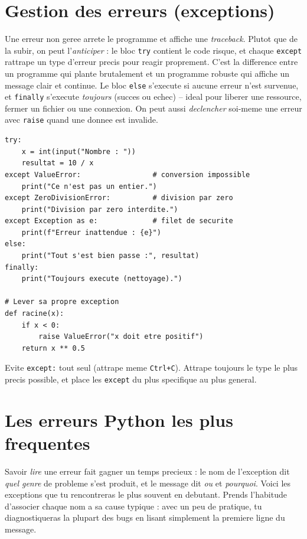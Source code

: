 \documentclass[11pt,a4paper]{article}
\begin{document}
\section{Gestion des erreurs (exceptions)}
Une erreur non geree arrete le programme et affiche une \emph{traceback}. Plutot
que de la subir, on peut l'\emph{anticiper} : le bloc \texttt{try} contient le
code risque, et chaque \texttt{except} rattrape un type d'erreur precis pour
reagir proprement. C'est la difference entre un programme qui plante brutalement
et un programme robuste qui affiche un message clair et continue. Le bloc
\texttt{else} s'execute si aucune erreur n'est survenue, et \texttt{finally}
s'execute \emph{toujours} (succes ou echec) -- ideal pour liberer une ressource,
fermer un fichier ou une connexion. On peut aussi \emph{declencher} soi-meme une
erreur avec \texttt{raise} quand une donnee est invalide.

\begin{lstlisting}
try:
    x = int(input("Nombre : "))
    resultat = 10 / x
except ValueError:                 # conversion impossible
    print("Ce n'est pas un entier.")
except ZeroDivisionError:          # division par zero
    print("Division par zero interdite.")
except Exception as e:             # filet de securite
    print(f"Erreur inattendue : {e}")
else:
    print("Tout s'est bien passe :", resultat)
finally:
    print("Toujours execute (nettoyage).")

# Lever sa propre exception
def racine(x):
    if x < 0:
        raise ValueError("x doit etre positif")
    return x ** 0.5
\end{lstlisting}

\begin{piege}
Evite \texttt{except:} tout seul (attrape meme \texttt{Ctrl+C}). Attrape
toujours le type le plus precis possible, et place les \texttt{except} du plus
specifique au plus general.
\end{piege}

\section{Les erreurs Python les plus frequentes}
Savoir \emph{lire} une erreur fait gagner un temps precieux : le nom de
l'exception dit \emph{quel genre} de probleme s'est produit, et le message dit
\emph{ou} et \emph{pourquoi}. Voici les exceptions que tu rencontreras le plus
souvent en debutant. Prends l'habitude d'associer chaque nom a sa cause typique :
avec un peu de pratique, tu diagnostiqueras la plupart des bugs en lisant
simplement la premiere ligne du message.
\end{document}
